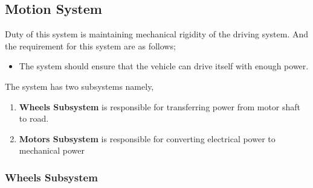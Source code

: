 \documentclass[a4paper,12pt]{article}
\begin{document}
\subsection{Motion System}


Duty of this system is maintaining mechanical rigidity of the driving system. And the requirement for this system are as follows;


\begin{itemize}

\item The system should ensure that the vehicle can drive itself with enough power.	

\end{itemize}	



\noindent The system has two subsystems namely,


\begin{enumerate}

\item \textbf{Wheels Subsystem} is responsible for transferring power from motor shaft to road.

\item \textbf{Motors Subsystem} is responsible for converting electrical power to mechanical power

\end{enumerate}


\subsubsection{Wheels Subsystem}
\end{document}

